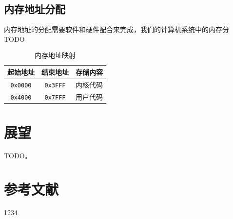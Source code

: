 \documentclass[11pt,utf8]{report}
\begin{document}
\section{内存地址分配}

内存地址的分配需要软件和硬件配合来完成，我们的计算机系统中的内存分TODO

\begin{table}[h]
\centering
\begin{tabular}{c|c|c}
\toprule[1.2pt]
\textbf{起始地址} & \textbf{结束地址} & \textbf{存储内容} \\
\midrule[1.2pt]
\texttt{0x0000} & \texttt{0x3FFF} & 内核代码 \\ \hline
\texttt{0x4000} & \texttt{0x7FFF} & 用户代码 \\
\bottomrule[1.2pt]
\end{tabular}
\caption{内存地址映射}
\end{table}


\chapter{展望}

	\par TODO。

\chapter{参考文献}

1234
\end{document}
